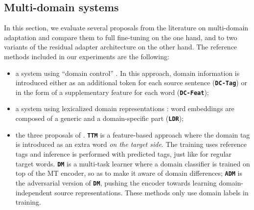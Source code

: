 \documentclass[11pt,a4paper]{article}
\newcommand{\system}[1]{\texttt{\textbf{#1}}}
\begin{document}
\subsection{Multi-domain systems}
In this section, we evaluate several proposals from the literature on multi-domain adaptation and compare them to full fine-tuning on the one hand, and to two variants of the residual adapter architecture on the other hand.
The reference methods included in our experiments are the following:
\begin{itemize}
\item a system using ``domain control'' \citep{Kobus17domaincontrol}. In this approach, domain information is introduced either as an additional token for each source sentence (\system{DC-Tag}) or in the form of a supplementary feature for each word (\system{DC-Feat});
\item a system using lexicalized domain representations \citep{Pham19generic}: word embeddings are composed of a generic and a domain-specific part (\system{LDR});
\item the three proposals of . \system{TTM} is a feature-based approach where the domain tag is introduced as an extra word \textsl{on the target side}. The training uses reference tags and inference is performed with predicted tags, just like for regular target words. \system{DM} is a multi-task learner where a domain classifier is trained on top of the MT encoder, so as to make it aware of domain differences; \system{ADM} is the adversarial version of \system{DM}, pushing the encoder towards learning domain-independent source representations. These methods only use domain labels in training.
\end{itemize}
\end{document}
